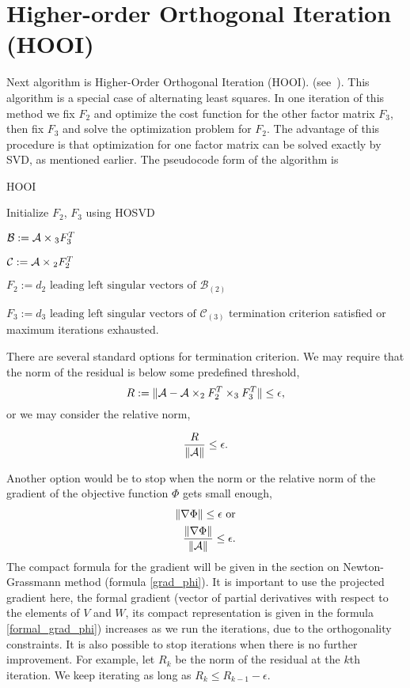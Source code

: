 \section{Higher-order Orthogonal Iteration (HOOI)}

Next algorithm is Higher-Order Orthogonal Iteration (HOOI). (see~\cite{kolda_bader_2009}).
This algorithm is a special case of alternating least squares.
In one iteration of this method we fix $F_2$ and optimize the cost function for the other factor matrix $F_3$,
then fix $F_3$ and solve the optimization problem for $F_2$. 
The advantage of this procedure is that optimization for one factor matrix can be solved exactly
by SVD, as mentioned earlier. The pseudocode form of the algorithm is

\begin{algorithm}
\caption{HOOI}\label{HOOI}
\begin{algorithmic}[1]
\State Initialize $F_2$, $F_3$ using HOSVD
\Repeat 


$\mathcal{B} := \mathcal{A} \times{_3} F_3^T$
    
    
$\mathcal{C} := \mathcal{A} \times{_2} F_2^T$
    
    
$F_2 := d_2 \mbox{ leading left singular vectors of }{\mathcal{B}}_{(2)}$
    
    
    $F_3 := d_3 \mbox{ leading left singular vectors of }{\mathcal{C}}_{(3)}$
\Until termination criterion satisfied or maximum iterations exhausted.
\end{algorithmic}
\end{algorithm}


There are several standard options for termination criterion.
We may require that the norm of the residual is below
some predefined threshold,
\begin{equation}
    R := \| \mathcal{A} - \mathcal{A} \times_2 F_2^T \times_3 F_3^T \| \leq \epsilon,
\end{equation} 
or we may consider the relative norm,

\begin{equation}
    \frac{R}{\| \mathcal{A} \| } \leq \epsilon.
\end{equation} 


Another option would be to stop when the norm or the relative norm of the gradient of the objective
function $\Phi$ gets small enough,
\begin{eqnarray}
    \| \nabla \Phi \| \leq \epsilon \mbox{ or}\\
    \frac{ \| \nabla \Phi \|  }{\| \mathcal{A} \| } \leq \epsilon.
\end{eqnarray} 
The compact formula for the gradient will be given in the section on Newton-Grassmann
method (formula \eqref{grad_phi}). It is important to use the projected
gradient here, the formal gradient (vector of partial
derivatives with respect to the elements of $V$ and $W$, its compact
representation is given in the formula \eqref{formal_grad_phi})
increases as we run the iterations, due to the 
orthogonality constraints.
It is also possible to stop iterations when there is no further improvement. 
For example, let $R_k$ be the norm of the residual
at the {$k$th} iteration. We keep iterating as long as  $R_k \leq R_{k-1} - \epsilon$.
